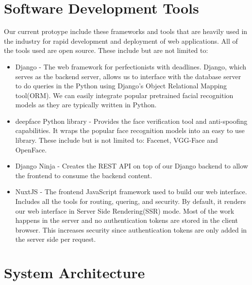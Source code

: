 \section{Software Development Tools}
 Our current protoype include these frameworks and tools that are heavily used in the industry for rapid development and deployment of web applications. All of the tools used are open source. These include but are not limited to:
 
\begin{itemize}
	\item	Django - The web framework for perfectionists with deadlines. Django, which serves as the backend server, allows us to interface with the database server to do queries in the Python using Django's Object Relational Mapping tool(ORM). We can easily integrate popular pretrained facial recognition models as they are typically written in Python.
\end{itemize}

\begin{itemize}
	\item	deepface Python library - Provides the face verification tool and anti-spoofing capabilities. It wraps the popular face recognition models into an easy to use library. These include but is not limited to: Facenet, VGG-Face and OpenFace.
\end{itemize}

\begin{itemize}
	\item	Django Ninja - Creates the REST API on top of our Django backend to allow the frontend to consume the backend content.
\end{itemize}

\begin{itemize}
	\item	NuxtJS - The frontend JavaScript framework used to build our web interface. Includes all the tools for routing, quering, and security. By default, it renders our web interface in Server Side Rendering(SSR) mode. Most of the work happens in the server and no authentication tokens are stored in the client browser. This increases security since authentication tokens are only added in the server side per request.
\end{itemize}


\section{System Architecture}

